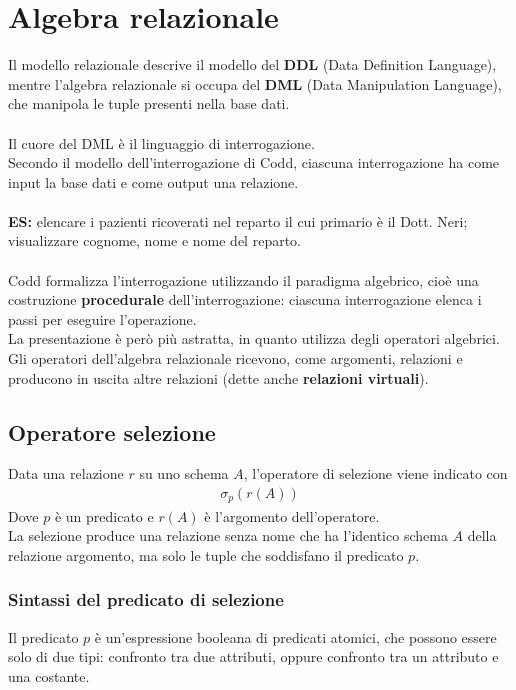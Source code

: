 \chapter{Algebra relazionale}

Il modello relazionale descrive il modello del \textbf{DDL} (Data Definition Language), mentre l'algebra relazionale si occupa del \textbf{DML} (Data Manipulation Language), che manipola le tuple presenti nella base dati.\\\\
Il cuore del DML è il linguaggio di interrogazione.\\
Secondo il modello dell'interrogazione di Codd, ciascuna interrogazione ha come input la base dati e come output una relazione.\\\\
\textbf{ES:} elencare i pazienti ricoverati nel reparto il cui primario è il Dott. Neri; visualizzare cognome, nome e nome del reparto.\\\\
Codd formalizza l'interrogazione utilizzando il paradigma algebrico, cioè una costruzione \textbf{procedurale} dell'interrogazione: ciascuna interrogazione elenca i passi per eseguire l'operazione.\\
La presentazione è però più astratta, in quanto utilizza degli operatori algebrici.\\
Gli operatori dell'algebra relazionale ricevono, come argomenti, relazioni e producono in uscita altre relazioni (dette anche \textbf{relazioni virtuali}).

\section{Operatore selezione}
Data una relazione $r$ su uno schema $A$, l'operatore di selezione viene indicato con
    \begin{equation}\begin{aligned}
        \sigma_{p}(r(A))
    \end{aligned}\end{equation}
Dove $p$ è un predicato e $r(A)$ è l'argomento dell'operatore.\\
La selezione produce una relazione senza nome che ha l'identico schema $A$ della relazione argomento, ma solo le tuple che soddisfano il predicato $p$.

\subsection{Sintassi del predicato di selezione}
Il predicato $p$ è un'espressione booleana di predicati atomici, che possono essere solo di due tipi: confronto tra due attributi, oppure confronto tra un attributo e una costante.

